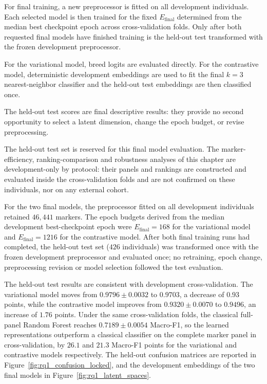 For final training, a new preprocessor is fitted on all development
individuals. Each selected model is then trained for the fixed
$E_{\mathrm{final}}$ determined from the median best checkpoint epoch
across cross-validation folds. Only after both requested final models have
finished training is the held-out test transformed with the frozen
development preprocessor.

For the variational model, breed logits are evaluated directly. For
the contrastive model, deterministic development embeddings are used
to fit the final $k=3$ nearest-neighbor classifier and the held-out test
embeddings are then classified once.

The held-out test scores are final descriptive results: they provide
no second opportunity to select a latent dimension, change the epoch
budget, or revise preprocessing.

The held-out test set is reserved for this final model evaluation. The
marker-efficiency, ranking-comparison and robustness analyses of this
chapter are development-only by protocol: their panels and rankings are
constructed and evaluated inside the cross-validation folds and are not
confirmed on these individuals, nor on any external cohort.

For the two final models, the preprocessor fitted on all development
individuals retained $46{,}441$ markers. The epoch budgets derived from
the median development best-checkpoint epoch were
$E_{\mathrm{final}}=168$ for the variational model and
$E_{\mathrm{final}}=1216$ for the contrastive model. After both final
training runs had completed, the held-out test set ($426$ individuals) was
transformed once with the frozen development preprocessor and evaluated
once; no retraining, epoch change, preprocessing revision or model
selection followed the test evaluation.

The held-out test results are consistent with development
cross-validation. The variational model moves from
$0.9796 \pm 0.0032$ to $0.9703$, a decrease of $0.93$ points, while
the contrastive model improves from $0.9320 \pm 0.0070$ to $0.9496$,
an increase of $1.76$ points. Under the same cross-validation folds,
the classical full-panel Random Forest reaches $0.7189 \pm 0.0054$
Macro-F1, so the learned representations outperform a classical
classifier on the complete marker panel in cross-validation, by $26.1$
and $21.3$ Macro-F1 points for the variational and contrastive models
respectively. The held-out confusion matrices are reported in
Figure~\ref{fig:rq1_confusion_locked}, and the development embeddings
of the two final models in Figure~\ref{fig:rq1_latent_spaces}.

